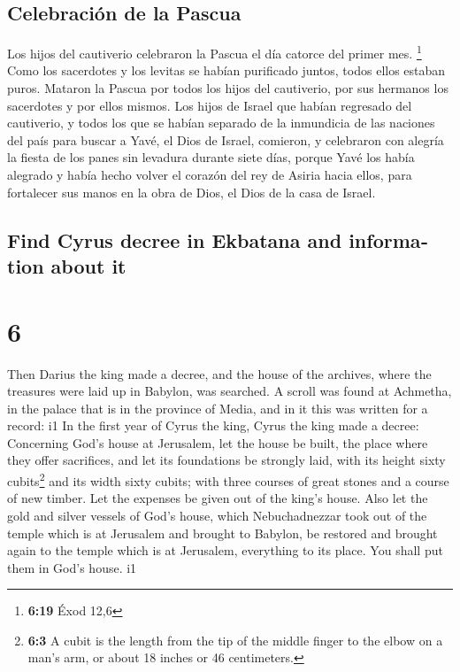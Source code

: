 \begin{paracol}{2}
\hypertarget{celebraciuxf3n-de-la-pascua}{%
\subsection{Celebración de la
Pascua}\label{celebraciuxf3n-de-la-pascua}}

 Los hijos del cautiverio celebraron la Pascua el día
catorce del primer mes. \footnote{\textbf{6:19} Éxod 12,6}
 Como los sacerdotes y los levitas se habían purificado
juntos, todos ellos estaban puros. Mataron la Pascua por todos los hijos
del cautiverio, por sus hermanos los sacerdotes y por ellos mismos.
 Los hijos de Israel que habían regresado del cautiverio,
y todos los que se habían separado de la inmundicia de las naciones del
país para buscar a Yavé, el Dios de Israel, comieron,  y
celebraron con alegría la fiesta de los panes sin levadura durante siete
días, porque Yavé los había alegrado y había hecho volver el corazón del
rey de Asiria hacia ellos, para fortalecer sus manos en la obra de Dios,
el Dios de la casa de Israel.

\switchcolumn
\begin{otherlanguage}{english}

\hypertarget{find-cyrus-decree-in-ekbatana-and-information-about-it}{%
\subsection{Find Cyrus decree in Ekbatana and information about
it}\label{find-cyrus-decree-in-ekbatana-and-information-about-it}}

\hypertarget{section-11}{%
\section{6}\label{section-11}}

 Then Darius the king made a decree, and the house of the
archives, where the treasures were laid up in Babylon, was searched.
 A scroll was found at Achmetha, in the palace that is in
the province of Media, and in it this was written for a record: i1
 In the first year of Cyrus the king, Cyrus the king made
a decree: Concerning God's house at Jerusalem, let the house be built,
the place where they offer sacrifices, and let its foundations be
strongly laid, with its height sixty cubits\footnote{\textbf{6:3} A
  cubit is the length from the tip of the middle finger to the elbow on
  a man's arm, or about 18 inches or 46 centimeters.} and its width
sixty cubits;  with three courses of great stones and a
course of new timber. Let the expenses be given out of the king's house.
 Also let the gold and silver vessels of God's house,
which Nebuchadnezzar took out of the temple which is at Jerusalem and
brought to Babylon, be restored and brought again to the temple which is
at Jerusalem, everything to its place. You shall put them in God's
house. i1


\end{otherlanguage}
\end{paracol}
